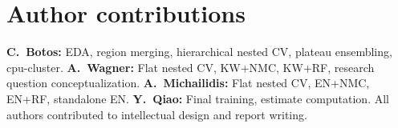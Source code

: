 \documentclass[11pt,a4paper,twocolumn]{article}
\begin{document}
\vspace{-4pt}
\section*{Author contributions}
\vspace{-2pt}

{\small
\textbf{C.~Botos:} EDA, region merging, hierarchical nested CV, plateau ensembling, cpu-cluster.
\textbf{A.~Wagner:} Flat nested CV, KW+NMC, KW+RF, research question conceptualization.
\textbf{A.~Michailidis:} Flat nested CV, EN+NMC, EN+RF, standalone EN.
\textbf{Y.~Qiao:} Final training, estimate computation.
All authors contributed to intellectual design and report writing.
}

\vspace{-3pt}

\end{document}
